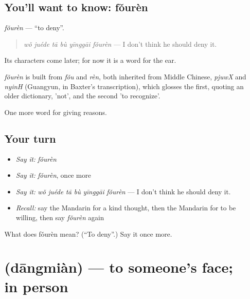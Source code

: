 \subsection*{You'll want to know: fǒurèn}
\emph{fǒurèn} — \textquotedblleft{}to deny\textquotedblright{}.

\begin{quote}
\emph{wǒ juéde tā bù yīnggāi fǒurèn} — I don't think he should deny it.
\end{quote}

Its characters come later; for now it is a word for the ear.

\begin{cousinweb}
\emph{fǒurèn} is built from \emph{fǒu} and \emph{rèn}, both inherited from Middle Chinese, \emph{pjuwX} and \emph{nyinH} (Guangyun, in Baxter's transcription), which glosses the first, quoting an older dictionary, 'not', and the second 'to recognize'.
\end{cousinweb}

\begin{grammarlens}[title={What you've built}]
One more word for giving reasons.
\end{grammarlens}

\subsection*{Your turn}
\begin{itemize}
\raggedright
  \item \emph{Say it:} \emph{fǒurèn}
  \item \emph{Say it:} \emph{fǒurèn}, once more
  \item \emph{Say it:} \emph{wǒ juéde tā bù yīnggāi fǒurèn} — I don't think he should deny it.
  \item \emph{Recall:} say the Mandarin for a kind thought, then the Mandarin for to be willing, then say \emph{fǒurèn} again
\end{itemize}

\begin{tcolorbox}[breakable,colback=teal!4,colframe=teal!35!black,title={Before you move on}]
What does fǒurèn mean? (\textquotedblleft{}To deny\textquotedblright{}.) Say it once more.
\end{tcolorbox}
\section[\texorpdfstring{\zh{当面} (dāngmiàn)}{当面 (dāngmiàn)}]{ (dāngmiàn) — to someone's face; in person}

